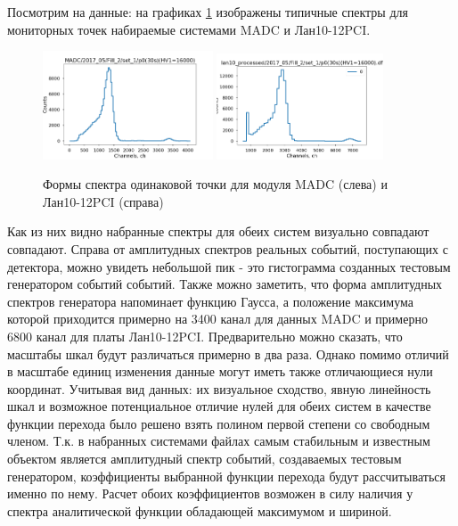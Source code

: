 \documentclass[a4paper,14pt]{extreport}
\begin{document}
Посмотрим на данные: на графиках \ref{fig:testing-shapes} изображены типичные спектры для мониторных точек набираемые системами MADC и Лан10-12PCI.

\begin{figure}
  \centering
  \includegraphics[width = 0.45\textwidth]{img/testing/madc_point_shape.png}
  \includegraphics[width = 0.44\textwidth]{img/testing/lan_point_shape.png}
    \caption{Формы спектра одинаковой точки для модуля MADC (слева) и Лан10-12PCI (справа)}
    \label{fig:testing-shapes}
\end{figure}

Как из них видно набранные спектры для обеих систем визуально совпадают совпадают. Справа от амплитудных спектров реальных событий, поступающих с детектора, можно увидеть небольшой пик - это гистограмма созданных тестовым генератором событий событий. Также можно заметить, что форма амплитудных спектров генератора напоминает функцию Гаусса, а положение максимума которой приходится примерно на 3400 канал для данных MADC и примерно 6800 канал для платы Лан10-12PCI. Предварительно можно сказать, что масштабы шкал будут различаться примерно в два раза. Однако помимо отличий в масштабе единиц изменения данные могут иметь также отличающиеся нули координат. Учитывая вид данных: их визуальное сходство, явную линейность шкал и возможное потенциальное отличие нулей для обеих систем в качестве функции перехода было решено взять полином первой степени со свободным членом. Т.к. в набранных системами файлах самым стабильным и известным объектом является амплитудный спектр событий, создаваемых тестовым генератором, коэффициенты выбранной функции перехода будут рассчитываться именно по нему. Расчет обоих коэффициентов возможен в силу наличия у спектра аналитической функции обладающей максимумом и шириной.
\end{document}
